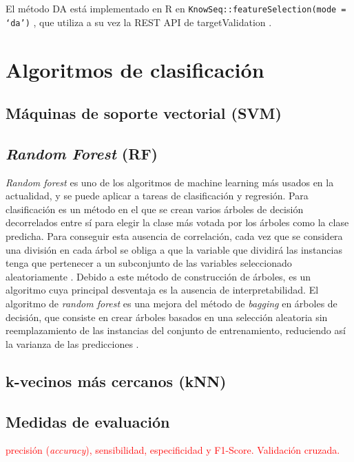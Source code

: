 El método DA  está implementado en R en \texttt{KnowSeq::featureSelection(mode = `da')} \cite{KnowSeq}, que utiliza a su vez la REST API de targetValidation \cite{OpenTargets2020}.

\section{Algoritmos de clasificación}

\subsection{Máquinas de soporte vectorial (SVM)}

\subsection{\textit{Random Forest} (RF)}

\textit{Random forest} es uno de los algoritmos de machine learning más usados en la actualidad, y se puede aplicar a tareas de clasificación y regresión. Para clasificación es un método en el que se crean varios árboles de decisión decorrelados entre sí para elegir la clase más votada por los árboles como la clase predicha. Para conseguir esta ausencia de correlación, cada vez que se considera una división en cada árbol se obliga a que la variable que dividirá las instancias tenga que pertenecer a un subconjunto de las variables seleccionado aleatoriamente \cite{Breiman2001, Breiman2002}. Debido a este método de construcción de árboles, es un algoritmo cuya principal desventaja es la ausencia de interpretabilidad. El algoritmo de \textit{random forest} es una mejora del método de \textit{bagging} en árboles de decisión, que consiste en crear árboles basados en una selección aleatoria sin reemplazamiento de las instancias del conjunto de entrenamiento, reduciendo así la varianza de las predicciones \cite{Breiman1996}.

\subsection{k-vecinos más cercanos (kNN)}

\subsection{Medidas de evaluación}

\textcolor{red}{precisión (\textit{accuracy}), sensibilidad, especificidad y F1-Score. Validación cruzada.}
